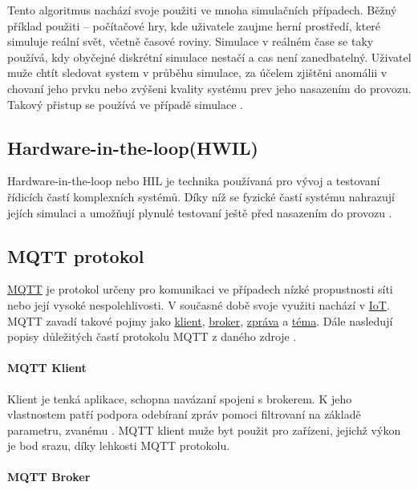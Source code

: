 Tento algoritmus nachází svoje použiti ve mnoha simulačních případech. Běžný příklad použiti -- počítačové hry, kde uživatele zaujme herní prostředí, které simuluje reální svět, včetně časové roviny. Simulace v reálném čase se taky používá, kdy obyčejné diskrétní simulace nestačí a cas není zanedbatelný. Uživatel muže chtít sledovat system v průběhu simulace, za účelem zjištěni anomálii v chovaní jeho prvku nebo zvýšeni kvality systému prev jeho nasazením do provozu. Takový přistup se používá ve případě simulace \hyperref[subsec:hwil]{}.

\subsection{Hardware-in-the-loop(HWIL)}
\label{subsec:hwil}

Hardware-in-the-loop nebo HIL je technika používaná pro vývoj a testovaní řídicích častí komplexních systémů. Díky níž se fyzické častí systému nahrazují jejích simulaci a umožňují plynulé testovaní ještě před nasazením do provozu \cite{hil}.

\subsection{MQTT protokol}
\label{subsec:mqtt-proto}

\href{http://mqtt.org/}{MQTT} je protokol určeny pro komunikaci ve případech nízké propustnosti síti nebo její vysoké nespolehlivosti. V současné době svoje využiti nachází v \href{https://en.wikipedia.org/wiki/Internet_of_things}{IoT}. MQTT zavadí takové pojmy jako \hyperref[par:client]{klient}, \hyperref[par:broker]{broker}, \hyperref[par:message]{zpráva} a \hyperref[par:topic]{téma}. Dále nasledují popisy důležitých častí protokolu MQTT z daného zdroje \cite{mqtt}.

\paragraph{MQTT Klient}
\label{par:client}

Klient je tenká aplikace, schopna navázaní spojeni s brokerem. K jeho vlastnostem patří podpora odebíraní zpráv pomoci filtrovaní na základě parametru, zvanému \hyperref[par:topic]{}. MQTT klient muže byt použit pro zařízeni, jejichž výkon je bod srazu, díky lehkosti MQTT protokolu.

\paragraph{MQTT Broker}
\label{par:broker}

